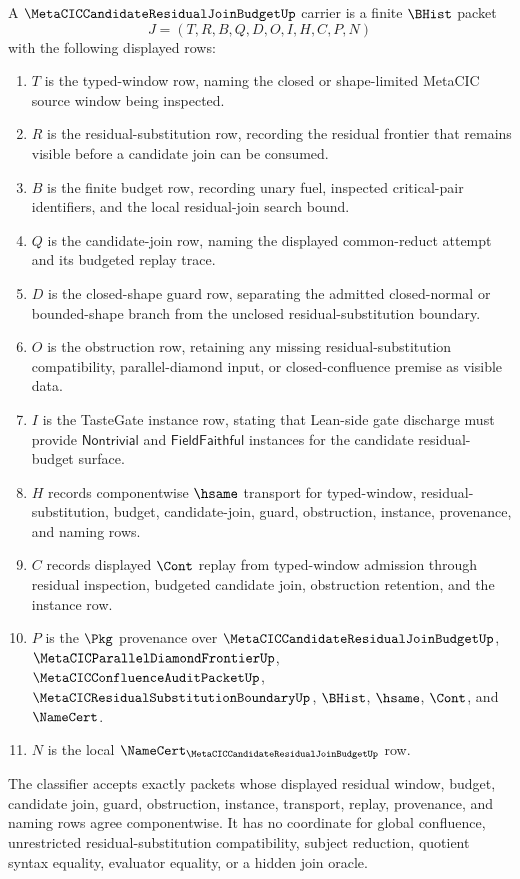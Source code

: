 \begin{definition}
\label{def:metacic-candidate-residual-join-budget-carrier}
A $\MetaCICCandidateResidualJoinBudgetUp$ carrier is a finite $\BHist$ packet
$$
J=(T,R,B,Q,D,O,I,H,C,P,N)
$$
with the following displayed rows:
\begin{enumerate}
\item $T$ is the typed-window row, naming the closed or shape-limited MetaCIC source window being inspected.
\item $R$ is the residual-substitution row, recording the residual frontier that remains visible before a candidate join can be consumed.
\item $B$ is the finite budget row, recording unary fuel, inspected critical-pair identifiers, and the local residual-join search bound.
\item $Q$ is the candidate-join row, naming the displayed common-reduct attempt and its budgeted replay trace.
\item $D$ is the closed-shape guard row, separating the admitted closed-normal or bounded-shape branch from the unclosed residual-substitution boundary.
\item $O$ is the obstruction row, retaining any missing residual-substitution compatibility, parallel-diamond input, or closed-confluence premise as visible data.
\item $I$ is the TasteGate instance row, stating that Lean-side gate discharge must provide $\mathsf{Nontrivial}$ and $\mathsf{FieldFaithful}$ instances for the candidate residual-budget surface.
\item $H$ records componentwise $\hsame$ transport for typed-window, residual-substitution, budget, candidate-join, guard, obstruction, instance, provenance, and naming rows.
\item $C$ records displayed $\Cont$ replay from typed-window admission through residual inspection, budgeted candidate join, obstruction retention, and the instance row.
\item $P$ is the $\Pkg$ provenance over $\MetaCICCandidateResidualJoinBudgetUp$, $\MetaCICParallelDiamondFrontierUp$, $\MetaCICConfluenceAuditPacketUp$, $\MetaCICResidualSubstitutionBoundaryUp$, $\BHist$, $\hsame$, $\Cont$, and $\NameCert$.
\item $N$ is the local $\NameCert_{\MetaCICCandidateResidualJoinBudgetUp}$ row.
\end{enumerate}
The classifier accepts exactly packets whose displayed residual window, budget, candidate join, guard, obstruction, instance, transport, replay, provenance, and naming rows agree componentwise. It has no coordinate for global confluence, unrestricted residual-substitution compatibility, subject reduction, quotient syntax equality, evaluator equality, or a hidden join oracle.
\end{definition}

